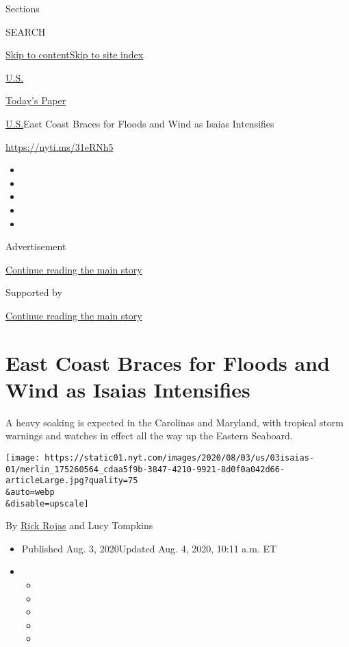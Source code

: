 Sections

SEARCH

\protect\hyperlink{site-content}{Skip to
content}\protect\hyperlink{site-index}{Skip to site index}

\href{https://www.nytimes.com/section/us}{U.S.}

\href{https://myaccount.nytimes.com/auth/login?response_type=cookie\&client_id=vi}{}

\href{https://www.nytimes.com/section/todayspaper}{Today's Paper}

\href{/section/us}{U.S.}\textbar{}East Coast Braces for Floods and Wind
as Isaias Intensifies

\url{https://nyti.ms/31eRNh5}

\begin{itemize}
\item
\item
\item
\item
\item
\end{itemize}

Advertisement

\protect\hyperlink{after-top}{Continue reading the main story}

Supported by

\protect\hyperlink{after-sponsor}{Continue reading the main story}

\hypertarget{east-coast-braces-for-floods-and-wind-as-isaias-intensifies}{%
\section{East Coast Braces for Floods and Wind as Isaias
Intensifies}\label{east-coast-braces-for-floods-and-wind-as-isaias-intensifies}}

A heavy soaking is expected in the Carolinas and Maryland, with tropical
storm warnings and watches in effect all the way up the Eastern
Seaboard.

\texttt{[image: https://static01.nyt.com/images/2020/08/03/us/03isaias-01/merlin\_175260564\_cdaa5f9b-3847-4210-9921-8d0f0a042d66-articleLarge.jpg?quality=75\\\&auto=webp\\\&disable=upscale]}

By \href{https://www.nytimes.com/by/rick-rojas}{Rick Rojas} and Lucy
Tompkins

\begin{itemize}
\item
  Published Aug. 3, 2020Updated Aug. 4, 2020, 10:11 a.m. ET
\item
  \begin{itemize}
  \item
  \item
  \item
  \item
  \item
  \end{itemize}
\end{itemize}

